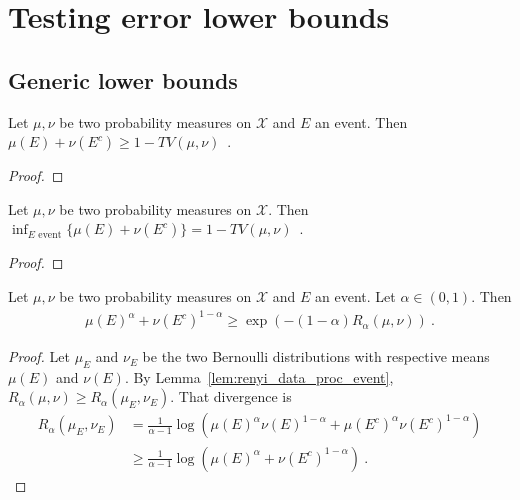 \chapter{Testing error lower bounds}

\section{Generic lower bounds}

\begin{lemma}
  \label{lem:testing_bound_tv}
  Let $\mu, \nu$ be two probability measures on $\mathcal X$ and $E$ an event. Then $\mu(E) + \nu(E^c) \ge 1 - TV(\mu, \nu)$~.
\end{lemma}

\begin{proof}
\end{proof}

\begin{theorem}
  \label{thm:testing_eq_tv}
  Let $\mu, \nu$ be two probability measures on $\mathcal X$. Then $\inf_{E \text{ event}}\{\mu(E) + \nu(E^c)\} = 1 - TV(\mu, \nu)$~.
\end{theorem}

\begin{proof}
\end{proof}

\begin{lemma}
  \label{lem:testing_bound_renyi_mean}
  Let $\mu, \nu$ be two probability measures on $\mathcal X$ and $E$ an event. Let $\alpha \in (0,1)$. Then
  \begin{align*}
  \mu(E)^\alpha + \nu(E^c)^{1 - \alpha}
  \ge \exp\left(-(1 - \alpha) R_{\alpha}(\mu, \nu)\right)
  \: .
  \end{align*}
\end{lemma}

\begin{proof}
Let $\mu_E$ and $\nu_E$ be the two Bernoulli distributions with respective means $\mu(E)$ and $\nu(E)$.
By Lemma~\ref{lem:renyi_data_proc_event}, $R_\alpha(\mu, \nu) \ge R_\alpha(\mu_E, \nu_E)$. That divergence is
\begin{align*}
R_\alpha(\mu_E, \nu_E)
&= \frac{1}{\alpha - 1}\log \left(\mu(E)^\alpha \nu(E)^{1 - \alpha}
  + \mu(E^c)^\alpha \nu(E^c)^{1 - \alpha}\right)
\\
&\ge \frac{1}{\alpha - 1}\log \left(\mu(E)^\alpha + \nu(E^c)^{1 - \alpha}\right)
\: .
\end{align*}
\end{proof}

